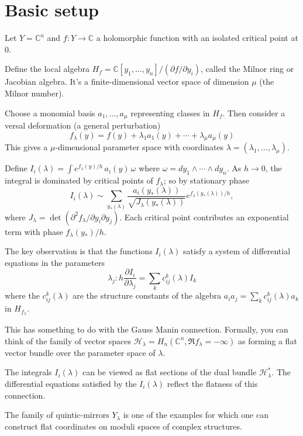 \documentclass[12pt]{article}
\begin{document}
\section{Basic setup}
Let $Y=\mathbb{C}^n$ and $f:Y\to \mathbb{C}$ a holomorphic function with an isolated critical point at $0$.

Define the local algebra $H_f = \mathbb{C}[y_1,\dots,y_n]/(\partial f/\partial y_i)$, called the Milnor ring or Jacobian algebra. It's a finite-dimensional vector space of dimension $\mu$ (the Milnor number).

Choose a monomial basis $a_1,\dots,a_\mu$ representing classes in $H_f$. Then consider a versal deformation (a general perturbation) \[f_\lambda(y) = f(y) + \lambda_1 a_1(y) + \cdots + \lambda_\mu a_\mu(y)\] This gives a $\mu$-dimensional parameter space with coordinates $\lambda= (\lambda_1,\dots,\lambda_\mu)$.

Define $I_i(\lambda) = \int e^{f_\lambda(y)/h}\, a_i(y)\, \omega$ where $\omega = dy_1\wedge\cdots\wedge dy_n$. As $h\to 0$, the integral is dominated by critical points of $f_\lambda$; so by stationary phase 
\[I_i(\lambda) \sim \sum_{y_*(\lambda)} \frac{a_i(y_*(\lambda))}{\sqrt{J_\lambda(y_*(\lambda))}} e^{f_\lambda(y_*(\lambda))/h},\] where $J_\lambda = \det(\partial^2 f_\lambda/\partial y_i \partial y_j)$. Each critical point contributes an exponential term with phase $f_\lambda(y_*)/h$.

The key observation is that the functions $I_i(\lambda)$ satisfy a system of differential equations in the parameters \[ \lambda_j: 
h\frac{\partial I_i}{\partial \lambda_j} = \sum_k c_{ij}^k(\lambda) I_k \] where the $c_{ij}^k(\lambda)$ are the structure constants of the algebra $a_i a_j = \sum_k c_{ij}^k(\lambda) a_k$ in $H_{f_\lambda}$. 

This has something to do with the Gauss Manin connection. Formally, you can think of the family of vector spaces $\mathcal{H}_\lambda = H_n(\mathbb{C}^n, \Re f_\lambda=-\infty)$ as forming a flat vector bundle over the parameter space of $\lambda$. 

The integrals $I_i(\lambda)$ can be viewed as flat sections of the dual bundle $\mathcal{H}^*_\lambda$. The differential equations satisfied by the $I_i(\lambda)$ reflect the flatness of this connection.

The family of quintic-mirrors $Y_\lambda$ is one of the examples for which one can construct flat coordinates on moduli spaces of complex structures. 
\end{document}
